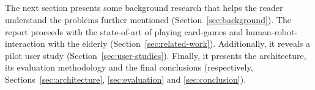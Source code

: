 \subsection*{\centering*}

The next section presents some background research that helps the reader understand the problems further mentioned (Section~\ref{sec:background}).
The report proceeds with the state-of-art of playing card-games and human-robot-interaction with the elderly (Section~\ref{sec:related-work}).
Additionally, it reveals a pilot user study (Section~\ref{sec:user-studies}).
Finally, it presents the architecture, its evaluation methodology and the final conclusions (respectively, Sections~\ref{sec:architecture}, \ref{sec:evaluation} and \ref{sec:conclusion}).


